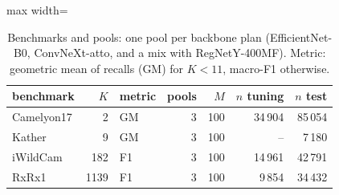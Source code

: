 \begin{table}[h]
\centering
\footnotesize
\caption{Benchmarks and pools: one pool per backbone plan (EfficientNet-B0, ConvNeXt-atto, and a mix with RegNetY-400MF). Metric: geometric mean of recalls (GM) for $K<11$, macro-F1 otherwise.}
\label{tab:pools}
\begin{adjustbox}{max width=\linewidth}
\begin{tabular}{lrlrrrr}
\toprule
benchmark & $K$ & metric & pools & $M$ & $n$ tuning & $n$ test \\
\midrule
Camelyon17 & 2 & GM & 3 & 100 & 34\,904 & 85\,054 \\
Kather & 9 & GM & 3 & 100 & -- & 7\,180 \\
iWildCam & 182 & F1 & 3 & 100 & 14\,961 & 42\,791 \\
RxRx1 & 1139 & F1 & 3 & 100 & 9\,854 & 34\,432 \\
\bottomrule
\end{tabular}
\end{adjustbox}
\end{table}
